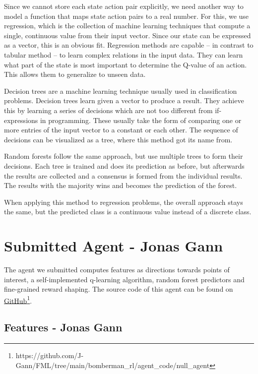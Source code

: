 \documentclass{article}
\begin{document}
Since we cannot store each state action pair explicitly, we need another way to model a function that maps state action pairs to a real number. For this, we use regression, which is the collection of machine learning techniques that compute a single, continuous value from their input vector. Since our state can be expressed as a vector, this is an obvious fit. Regression methods are capable -- in contrast to tabular method -- to learn complex relations in the input data. They can learn what part of the state is most important to determine the Q-value of an action. This allows them to generalize to unseen data. 

Decision trees are a machine learning technique usually used in classification problems. Decision trees learn given a vector to produce a result. They achieve this by learning a series of decisions which are not too different from if-expressions in programming. These usually take the form of comparing one or more entries of the input vector to a constant or each other. The sequence of decisions can be visualized as a tree, where this method got its name from.

Random forests follow the same approach, but use multiple trees to form their decisions. Each tree is trained and does its prediction as before, but afterwards the results are collected and a consensus is formed from the individual results. The results with the majority wins and becomes the prediction of the forest.

When applying this method to regression problems, the overall approach stays the same, but the predicted class is a continuous value instead of a discrete class.

\section[Submitted Agent]{Submitted Agent  {\small - Jonas Gann}} \label{sec:submitted_agent}

The agent we submitted computes features as directions towards points of interest, a self-implemented q-learning algorithm, random forest predictors and fine-grained reward shaping. The source code of this agent can be found on \href{https://github.com/J-Gann/FML/tree/main/bomberman\_rl/agent\_code/null\_agent}{GitHub}\footnote{https://github.com/J-Gann/FML/tree/main/bomberman\_rl/agent\_code/null\_agent}.

\subsection[Features]{Features {\small - Jonas Gann}}
\end{document}
